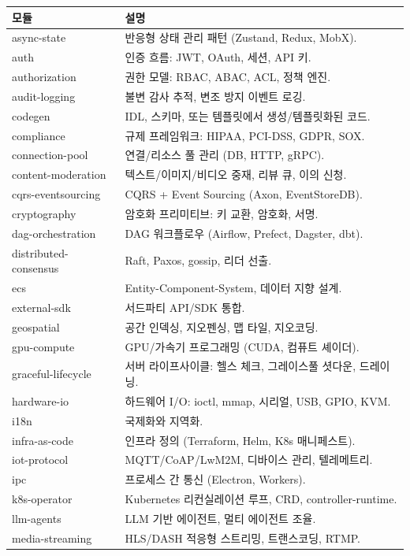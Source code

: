 \documentclass[11pt,a4paper,openright,twoside]{report}
\begin{document}
\begin{longtable}{lp{9cm}}
\toprule
\textbf{모듈} & \textbf{설명} \\
\midrule
\endhead
async-state & 반응형 상태 관리 패턴 (Zustand, Redux, MobX). \\
auth & 인증 흐름: JWT, OAuth, 세션, API 키. \\
authorization & 권한 모델: RBAC, ABAC, ACL, 정책 엔진. \\
audit-logging & 불변 감사 추적, 변조 방지 이벤트 로깅. \\
codegen & IDL, 스키마, 또는 템플릿에서 생성/템플릿화된 코드. \\
compliance & 규제 프레임워크: HIPAA, PCI-DSS, GDPR, SOX. \\
connection-pool & 연결/리소스 풀 관리 (DB, HTTP, gRPC). \\
content-moderation & 텍스트/이미지/비디오 중재, 리뷰 큐, 이의 신청. \\
cqrs-eventsourcing & CQRS + Event Sourcing (Axon, EventStoreDB). \\
cryptography & 암호화 프리미티브: 키 교환, 암호화, 서명. \\
dag-orchestration & DAG 워크플로우 (Airflow, Prefect, Dagster, dbt). \\
distributed-consensus & Raft, Paxos, gossip, 리더 선출. \\
ecs & Entity-Component-System, 데이터 지향 설계. \\
external-sdk & 서드파티 API/SDK 통합. \\
geospatial & 공간 인덱싱, 지오펜싱, 맵 타일, 지오코딩. \\
gpu-compute & GPU/가속기 프로그래밍 (CUDA, 컴퓨트 셰이더). \\
graceful-lifecycle & 서버 라이프사이클: 헬스 체크, 그레이스풀 셧다운, 드레이닝. \\
hardware-io & 하드웨어 I/O: ioctl, mmap, 시리얼, USB, GPIO, KVM. \\
i18n & 국제화와 지역화. \\
infra-as-code & 인프라 정의 (Terraform, Helm, K8s 매니페스트). \\
iot-protocol & MQTT/CoAP/LwM2M, 디바이스 관리, 텔레메트리. \\
ipc & 프로세스 간 통신 (Electron, Workers). \\
k8s-operator & Kubernetes 리컨실레이션 루프, CRD, controller-runtime. \\
llm-agents & LLM 기반 에이전트, 멀티 에이전트 조율. \\
media-streaming & HLS/DASH 적응형 스트리밍, 트랜스코딩, RTMP. \\

\end{longtable}
\end{document}
